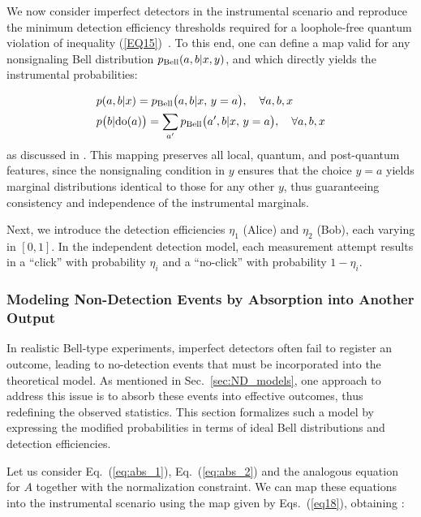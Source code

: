 \documentclass[aps,pra,reprint, superscriptaddress,showkeys]{revtex4-2}
\theoremstyle{plain}
\begin{document}
We now consider imperfect detectors in the instrumental scenario and reproduce the minimum detection efficiency thresholds required for a loophole-free quantum violation of inequality (\ref{EQ15})~\cite{ObsInt_Bell}. To this end, one can define a map valid for any nonsignaling Bell distribution \(p_{\rm Bell}(a,b| x,y)\), and which directly yields the instrumental probabilities:

\begin{align}\label{eq18}
&p(a,b|x) = p_{\rm Bell}\bigl(a,b|x,\,y=a\bigr), \quad \forall a,b,x \\ \nonumber
&p\bigl(b| \mathrm{do}(a)\bigr) = \sum_{a'} p_{\rm Bell}\bigl(a',b| x,\,y=a\bigr), \quad \forall a,b,x
\end{align}
as discussed in \cite{GMR_QCI}. This mapping preserves all local, quantum, and post-quantum features, since the nonsignaling condition in \(y\) ensures that the choice \(y = a\) yields marginal distributions identical to those for any other \(y\), thus guaranteeing consistency and independence of the instrumental marginals. 

Next, we introduce the detection efficiencies \(\eta_{1}\) (Alice) and \(\eta_{2}\) (Bob), each varying in \([0,1]\). In the independent detection model, each measurement attempt results in a “click” with probability \(\eta_i\) and a “no-click” with probability \(1 - \eta_i\). 

\subsubsection{Modeling Non-Detection Events by Absorption into Another Output}
\label{sec: instrumental_Model1}

In realistic Bell-type experiments, imperfect detectors often fail to register an outcome, leading to no-detection events that must be incorporated into the theoretical model. As mentioned in Sec.~\ref{sec:ND_models}, one approach to address this issue is to absorb these events into effective outcomes, thus redefining the observed statistics. This section formalizes such a model by expressing the modified probabilities in terms of ideal Bell distributions and detection efficiencies. 

 Let us consider Eq.~(\ref{eq:abs_1}), Eq.~(\ref{eq:abs_2}) and the analogous equation for $A$ together with the normalization constraint. We can map these equations into the instrumental scenario using the map given by Eqs.~(\ref{eq18}), obtaining \cite{ObsInt_Bell}:
\end{document}
